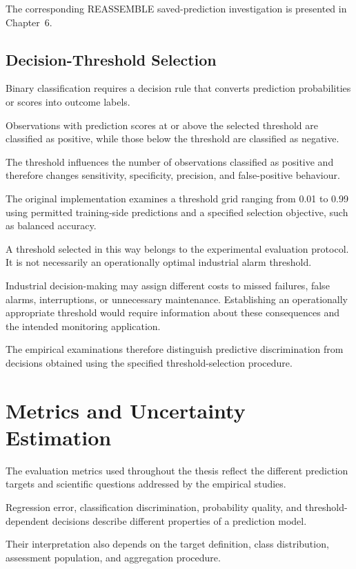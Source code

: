 The corresponding REASSEMBLE saved-prediction investigation is presented in Chapter~6.

\subsection{Decision-Threshold Selection}

Binary classification requires a decision rule that converts prediction probabilities or scores into outcome labels.

Observations with prediction scores at or above the selected threshold are classified as positive, while those below the threshold are classified as negative.

The threshold influences the number of observations classified as positive and therefore changes sensitivity, specificity, precision, and false-positive behaviour.

The original implementation examines a threshold grid ranging from 0.01 to 0.99 using permitted training-side predictions and a specified selection objective, such as balanced accuracy.

A threshold selected in this way belongs to the experimental evaluation protocol. It is not necessarily an operationally optimal industrial alarm threshold.

Industrial decision-making may assign different costs to missed failures, false alarms, interruptions, or unnecessary maintenance. Establishing an operationally appropriate threshold would require information about these consequences and the intended monitoring application.

The empirical examinations therefore distinguish predictive discrimination from decisions obtained using the specified threshold-selection procedure.

\section{Metrics and Uncertainty Estimation}
\label{sec:ch4-metrics}

The evaluation metrics used throughout the thesis reflect the different prediction targets and scientific questions addressed by the empirical studies.

Regression error, classification discrimination, probability quality, and threshold-dependent decisions describe different properties of a prediction model.

Their interpretation also depends on the target definition, class distribution, assessment population, and aggregation procedure.


